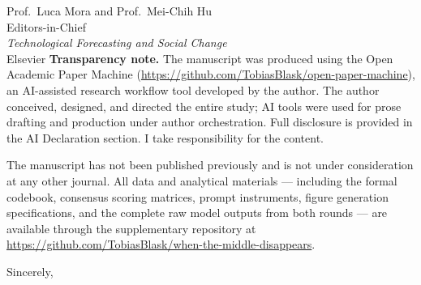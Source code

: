 \documentclass[11pt]{letter}
\begin{document}
\begin{letter}{%
Prof.\ Luca Mora and Prof.\ Mei-Chih Hu\\
Editors-in-Chief\\
\textit{Technological Forecasting and Social Change}\\
Elsevier}
\textbf{Transparency note.} The manuscript was produced using the Open Academic Paper Machine (\url{https://github.com/TobiasBlask/open-paper-machine}), an AI-assisted research workflow tool developed by the author. The author conceived, designed, and directed the entire study; AI tools were used for prose drafting and production under author orchestration. Full disclosure is provided in the AI Declaration section. I take responsibility for the content.

The manuscript has not been published previously and is not under consideration at any other journal. All data and analytical materials --- including the formal codebook, consensus scoring matrices, prompt instruments, figure generation specifications, and the complete raw model outputs from both rounds --- are available through the supplementary repository at \url{https://github.com/TobiasBlask/when-the-middle-disappears}.

\closing{Sincerely,}

\end{letter}
\end{document}
